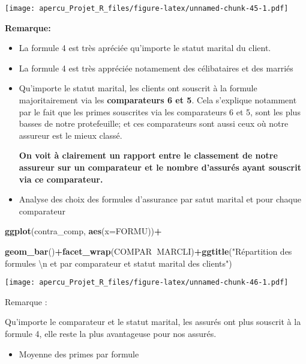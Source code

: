 \documentclass[
]{article}
\newenvironment{Shaded}{\begin{snugshade}}{\end{snugshade}}
\newcommand{\CharTok}[1]{\textcolor[rgb]{0.31,0.60,0.02}{#1}}
\newcommand{\DataTypeTok}[1]{\textcolor[rgb]{0.13,0.29,0.53}{#1}}
\newcommand{\KeywordTok}[1]{\textcolor[rgb]{0.13,0.29,0.53}{\textbf{#1}}}
\newcommand{\NormalTok}[1]{#1}
\newcommand{\OperatorTok}[1]{\textcolor[rgb]{0.81,0.36,0.00}{\textbf{#1}}}
\newcommand{\StringTok}[1]{\textcolor[rgb]{0.31,0.60,0.02}{#1}}
\providecommand{\tightlist}{%
  \setlength{\itemsep}{0pt}\setlength{\parskip}{0pt}}
\begin{document}
\texttt{[image: apercu\_Projet\_R\_files/figure-latex/unnamed-chunk-45-1.pdf]}

\textbf{Remarque:}

\begin{itemize}
\item
  La formule 4 est très apréciée qu'importe le statut marital du client.
\item
  La formule 4 est très appréciée notamement des célibataires et des
  marriés
\item
  Qu'importe le statut marital, les clients ont souscrit à la formule
  majoritairement via les \textbf{comparateurs 6 et 5}. Cela s'explique
  notamment par le fait que les primes souscrites via les comparateurs 6
  et 5, sont les plus basses de notre protefeuille; et ces comparateurs
  sont aussi ceux où notre assureur est le mieux classé.

  \textbf{On voit à clairement un rapport entre le classement de notre
  assureur sur un comparateur et le nombre d'assurés ayant souscrit via
  ce comparateur.}
\item
  Analyse des choix des formules d'assurance par satut marital et pour
  chaque comparateur
\end{itemize}

\begin{Shaded}
\begin{Highlighting}[]
\KeywordTok{ggplot}\NormalTok{(contra_comp, }\KeywordTok{aes}\NormalTok{(}\DataTypeTok{x=}\NormalTok{FORMU))}\OperatorTok{+}

\KeywordTok{geom_bar}\NormalTok{()}\OperatorTok{+}\KeywordTok{facet_wrap}\NormalTok{(COMPAR}\OperatorTok{~}\NormalTok{MARCLI)}\OperatorTok{+}\KeywordTok{ggtitle}\NormalTok{(}\StringTok{"Répartition des formules }\CharTok{\textbackslash{}n}\StringTok{ et par comparateur et statut marital des clients"}\NormalTok{)}
\end{Highlighting}
\end{Shaded}

\texttt{[image: apercu\_Projet\_R\_files/figure-latex/unnamed-chunk-46-1.pdf]}

Remarque :

Qu'importe le comparateur et le statut marital, les assurés ont plus
souscrit à la formule 4, elle reste la plus avantageuse pour nos
assurés.

\begin{itemize}
\tightlist
\item
  Moyenne des primes par formule
\end{itemize}
\end{document}
